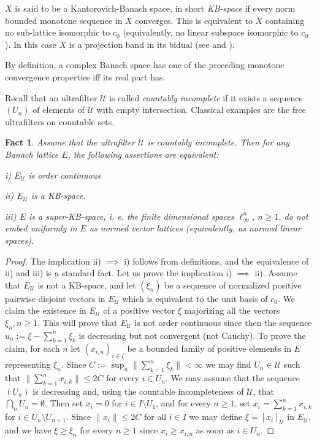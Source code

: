\documentclass[11pt]{amsart}
\theoremstyle{plain}
\newtheorem{fact}[theorem]{Fact}
\theoremstyle{remark}
\newcommand{\U}{\mathcal U}
\begin{document}
$X$ is said to be a Kantorovich-Banach space, in short {\it KB-space}  if every norm bounded monotone sequence  in $X$  converges. This is equivalent to $X$ containing no sub-lattice isomorphic to $c_0$ (equivalently, no linear subspace isomorphic to $c_0$). In this case $X$ is a projection band in its bidual (see \cite[section 2.4]{MN} and \cite[Theorem 1.c.4]{LT}).

By definition, a complex Banach space has one of the preceding monotone convergence properties iff its real part has.

Recall that an ultrafilter $\U$ is called {\it countably incomplete} if it exists a sequence $(U_n)$ of elements of $\U$ with empty intersection. Classical examples are the free ultrafilters on countable sets.

\begin{fact}\label{fact:ultra-oc}
Assume that the ultrafilter $\U$ is countably incomplete. Then for any Banach lattice $E$, the following assertions are equivalent: 

i) $E_\U$ is order continuous

ii) $E_\U$ is a KB-space.

iii) $E$ is a super-KB-space, i. e. the finite dimensional spaces $\ell_\infty^n$, $n\ge 1$, do not embed uniformly in $E$  as normed  vector lattices (equivalently, as normed linear spaces).
\end{fact}

\begin{proof}
The implication ii) $\implies$ i) follows from definitions, and the equivalence of ii) and iii) is a standard fact. Let us  prove the implication  i) $\implies$ ii). Assume that $E_\U$ is not a KB-space, and let $(\xi_n)$ be a sequence of normalized positive pairwise disjoint vectors in $E_\U$ which is equivalent to the unit basis of $c_0$. We claim the existence in $E_\U$ of a positive vector $\xi$ majorizing all the vectors $\xi_n, n\ge 1$. This will prove that $E_\U$ is not order continuous since then the sequence $u_n:=\xi-\sum_{k=1}^n\xi_k$ is decreasing but not convergent (not Cauchy). To prove the claim, for each $n$ let $(x_{i,n})_{i\in I}$ be a bounded family of positive elements in $E$ representing $\xi_n$. Since $C:=\sup_n\|\sum_{k=1}^n\xi_k\|<\infty$ we may find $U_n\in\U$ such that $\|\sum_{k=1}^n x_{i,k}\|\le 2C$ for every $i\in U_n$. We may assume that the sequence $(U_n)$ is decreasing and, using the countable incompleteness of $\U$, that  $\bigcap_n U_n=\emptyset$. Then set $x_i=0$ for $i\in I\setminus U_1$, and for every $n\ge 1$, set $x_i=\sum_{k=1}^n x_{i,k}$ for $i\in U_n\setminus U_{n+1}$. Since $\|x_i\|\le 2C$ for all $i\in I$ we may define   $\xi=[x_i]_\U$ in $E_\U$, and we have $\xi\ge \xi_n$ for every $n\ge 1$ since $x_i\ge x_{i,n}$ as soon as $i\in U_n$.
\end{proof}
\end{document}
